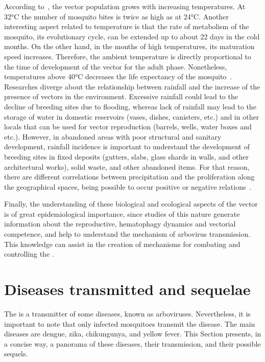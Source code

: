 According to~\cite{focks1995simulation}, the vector population grows with increasing temperatures. At 32°C the number of mosquito bites is twice as high as at 24°C.
Another interesting aspect related to temperature is that the rate of metabolism of the mosquito, its evolutionary cycle, can be extended up to about 22 days in the cold months.
On the other hand, in the months of high temperatures, its maturation speed increases.
Therefore, the ambient temperature is directly proportional to the time of development of the vector for the adult phase.
Nonetheless, temperatures above 40°C decreases the life expectancy of the mosquito~\cite{patz1998dengue}.
Researches diverge about the relationship between rainfall and the increase of the presence of vectors in the environment.
Excessive rainfall could lead to the decline of breeding sites due to flooding, whereas lack of rainfall may lead to the storage of water in domestic reservoirs (vases, dishes, canisters, etc.) and in other locals that can be used for vector reproduction (barrels, wells, water boxes and etc.).
However, in abandoned areas with poor structural and sanitary development, rainfall incidence is important to understand the development of breeding sites in fixed deposits (gutters, slabs, glass shards in walls, and other architectural works), solid waste, and other abandoned items.
For that reason, there are different correlations between precipitation and the \Aedes proliferation along the geographical spaces, being possible to occur positive or negative relations~\cite{arcari2007regional}.

Finally, the understanding of these biological and ecological aspects of the vector is of great epidemiological importance, since studies of this nature generate information about the reproductive, hematophagy dynamics and vectorial competence, and help to understand the mechanism of arbovirus transmission.
This knowledge can assist in the creation of mechanisms for combating and controlling the \Aedes.



\section{Diseases transmitted and sequelae}
%
The \Aedes is a transmitter of some diseases, known as arboviruses.
Nevertheless, it is important to note that only infected mosquitoes transmit the disease.
The main diseases are dengue, zika, chikungunya, and yellow fever.
This Section presents, in a concise way, a panorama of these diseases, their transmission, and their possible sequels.

